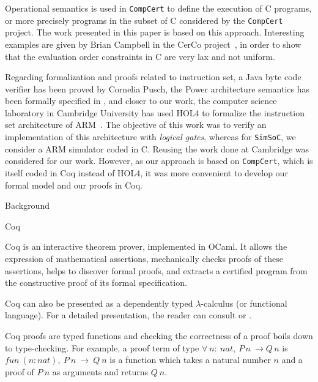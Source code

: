\documentclass[twocolumn]{article}
\makeatletter
\def\section{\@startsection {section}{1}{\z@}{20pt plus 2pt minus 2pt}
{8pt plus 2pt minus 2pt}{\centering\normalsize\sc
\edef\@svsec{\thesection.\ }}}
\def\thesection{\Roman{section}}
\def\subsection{\@startsection {subsection}{2}{\z@}{16pt plus 2pt minus 2pt}
{6pt plus 2pt minus 2pt}{\normalsize\sl
\edef\@svsec{\thesubsection.\ }}}
\def\thesubsection{\Alph{subsection}}
\newcommand{\compcert}{\texttt{CompCert}\xspace}
\newcommand{\simsoc}{\texttt{SimSoC}\xspace}
\makeatother
\begin{document}
Operational semantics is used in \compcert to define the execution of
C programs, or more precisely programs in the subset of C considered
by the \compcert project.  The work presented in this paper is based
on this approach.  Interesting examples are given by Brian Campbell in
the CerCo project~\cite{campbell2012executable}, in order to show that
the evaluation order constraints in C are very lax and not uniform.

Regarding formalization and proofs related to instruction set, a Java
byte code verifier has been proved by Cornelia Pusch\cite{pusch-1999},
the Power architecture semantics has been formally specified in
\cite{alglave-2009}, and closer to our work, the computer science
laboratory in Cambridge University has used HOL4 to formalize the
instruction set architecture of ARM~\cite{FoxM10}. The
objective of this work was to verify an implementation of this
architecture with \emph{logical gates}, whereas for \simsoc, we
consider a ARM simulator coded in C.  Reusing the work done at Cambridge
was considered for our work.  However, as our approach is based on
\compcert, which is itself coded in Coq instead of HOL4, it was more
convenient to develop our formal model and our proofs in Coq.

\section{Background} %
\label{background}

\subsection{Coq}

Coq\cite{coqart} is an interactive theorem prover, implemented in
OCaml. It allows the expression of mathematical assertions,
mechanically checks proofs of these assertions, helps to discover
formal proofs, and extracts a certified program from the constructive
proof of its formal specification.

Coq can also be presented as a dependently typed $\lambda$-calculus
(or functional language).  For a detailed presentation, the reader can
consult \cite{coqmanual} or \cite{coqart}.

Coq proofs are typed functions and checking the correctness of a proof
boils down to type-checking. For example, a proof term of type
$\forall~n:~nat,~P\, n~\rightarrow Q\, n$ is $fun~(n:nat),~P~n~\rightarrow ~Q~n$
is a function which takes a natural number $n$ and a proof of $P~n$ as arguments
and returns $Q~n$.
\end{document}

